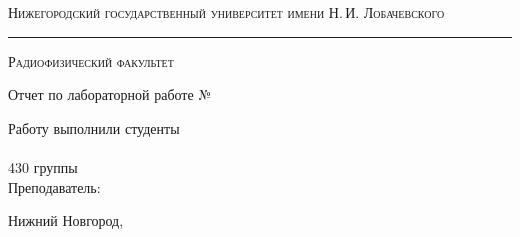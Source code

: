 \begin{titlepage}

\begin{center}

	\textsc{Нижегородский государственный университет имени Н.\,И. Лобачевского}
	\vskip 4pt \hrule \vskip 8pt
	\textsc{Радиофизический факультет}

	\vfill

	{\Large Отчет по лабораторной работе №\labnum \vskip 20pt\bfseries \labname}

\end{center}

\vfill

\begin{flushright}
	{Работу выполнили студенты\\ \authors\\ 430 группы\\ \vskip 14pt Преподаватель:\\ \sciadviser}
\end{flushright}

\vfill

\begin{center}
	Нижний Новгород, \the\year
\end{center}

\end{titlepage}